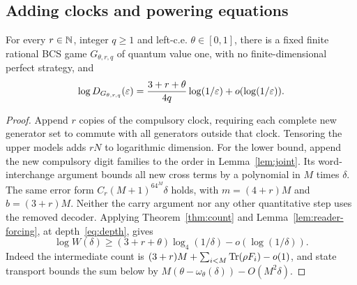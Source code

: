 \subsection{Adding clocks and powering equations}
\begin{proposition}\label{prop:realization-parameters}
For every $r\in\mathbb N$, integer $q\ge1$ and left-c.e. $\theta\in[0,1]$, there is a fixed finite rational BCS game $G_{\theta,r,q}$ of quantum value one, with no finite-dimensional perfect strategy, and
\begin{equation}\label{eq:parameter-exponent}
 \log D_{G_{\theta,r,q}}(\varepsilon)
 =\frac{3+r+\theta}{4q}\log(1/\varepsilon)+o(\log(1/\varepsilon)).
\end{equation}
\end{proposition}
\begin{proof}
Append $r$ copies of the compulsory clock, requiring each complete new generator set to commute with all generators outside that clock. Tensoring the upper models adds $rN$ to logarithmic dimension. For the lower bound, append the new compulsory digit families to the order in Lemma~\ref{lem:joint}. Its word-interchange argument bounds all new cross terms by a polynomial in $M$ times $\delta$. The same error form $C_r(M+1)^64^M\delta$ holds, with $m=(4+r)M$ and $b=(3+r)M$. Neither the carry argument nor any other quantitative step uses the removed decoder. Applying Theorem~\ref{thm:count} and Lemma~\ref{lem:reader-forcing}, at depth~\eqref{eq:depth}, gives
\begin{equation}\label{eq:reader-source-profile}
 \log W(\delta)\ge(3+r+\theta)\log_4(1/\delta)
 -o(\log(1/\delta)).
\end{equation}
Indeed the intermediate count is $(3+r)M+\sum_{i<M}\operatorname{Tr}(\rho F_i)-o(1)$, and state transport bounds the sum below by $M(\theta-\omega_\theta(\delta))-O(M^2\delta)$.


\end{proof}
